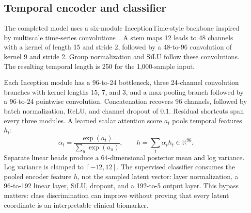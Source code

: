 \documentclass[11pt,a4paper]{article}
\begin{document}
\subsection{Temporal encoder and classifier}
The completed model uses a six-module InceptionTime-style backbone inspired by multiscale time-series convolutions~\cite{inception}. A stem maps 12 leads to 48 channels with a kernel of length 15 and stride 2, followed by a 48-to-96 convolution of kernel 9 and stride 2. Group normalization and SiLU follow these convolutions. The resulting temporal length is 250 for the 1,000-sample input.

Each Inception module has a 96-to-24 bottleneck, three 24-channel convolution branches with kernel lengths 15, 7, and 3, and a max-pooling branch followed by a 96-to-24 pointwise convolution. Concatenation recovers 96 channels, followed by batch normalization, ReLU, and channel dropout of 0.1. Residual shortcuts span every three modules. A learned scalar attention score $a_t$ pools temporal features $h_t$:
\begin{equation}
\alpha_t=\frac{\exp(a_t)}{\sum_{u}\exp(a_u)},\qquad h=\sum_t\alpha_t h_t\in\mathbb{R}^{96}.
\end{equation}
Separate linear heads produce a 64-dimensional posterior mean and log variance. Log variance is clamped to $[-12,12]$. The supervised classifier consumes the pooled encoder feature $h$, not the sampled latent vector: layer normalization, a 96-to-192 linear layer, SiLU, dropout, and a 192-to-5 output layer. This bypass matters: class discrimination can improve without proving that every latent coordinate is an interpretable clinical biomarker.
\end{document}
